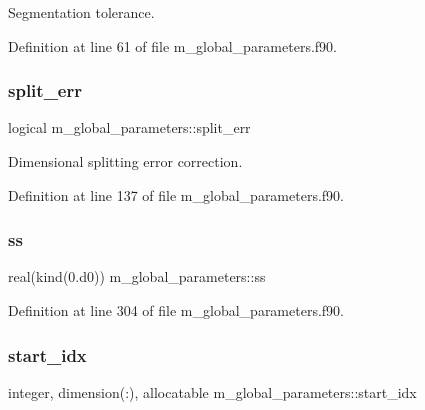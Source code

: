 Segmentation tolerance. 



Definition at line 61 of file m\+\_\+global\+\_\+parameters.\+f90.

\mbox{\label{namespacem__global__parameters_a9adf65c5de7c360aa44f595f561c87b0}} 
\subsubsection{\texorpdfstring{split\+\_\+err}{split\_err}}
{\footnotesize\ttfamily logical m\+\_\+global\+\_\+parameters\+::split\+\_\+err}



Dimensional splitting error correction. 



Definition at line 137 of file m\+\_\+global\+\_\+parameters.\+f90.

\mbox{\label{namespacem__global__parameters_ab2260b0199f0043981fba75890dbff3d}} 
\subsubsection{\texorpdfstring{ss}{ss}}
{\footnotesize\ttfamily real(kind(0.d0)) m\+\_\+global\+\_\+parameters\+::ss}



Definition at line 304 of file m\+\_\+global\+\_\+parameters.\+f90.

\mbox{\label{namespacem__global__parameters_a4bd117ae744eab60f3d681fd03d6e90d}} 
\subsubsection{\texorpdfstring{start\+\_\+idx}{start\_idx}}
{\footnotesize\ttfamily integer, dimension(\+:), allocatable m\+\_\+global\+\_\+parameters\+::start\+\_\+idx}



